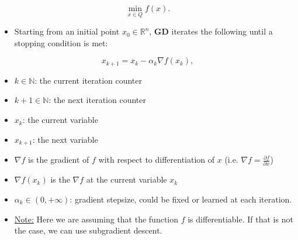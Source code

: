 \documentclass{article}
\begin{document}
\[
\min_{x \in Q} f(x).
\]

\begin{itemize}
    \item Starting from an initial point $x_0 \in \mathbb{R}^n$, \textbf{GD} iterates the following until a stopping condition is met:
\end{itemize}

\[
x_{k+1} = x_k - \alpha_k \nabla f(x_k),
\]

\begin{itemize}
    \item $k \in \mathbb{N}$: the current iteration counter
    \item $k + 1 \in \mathbb{N}$: the next iteration counter
    \item $x_k$: the current variable
    \item $x_{k+1}$: the next variable
    \item $\nabla f$ is the gradient of $f$ with respect to differentiation of $x$ (i.e. $\nabla f = \frac{\partial f}{\partial x}$)
    \item $\nabla f(x_k)$ is the $\nabla f$ at the current variable $x_k$
    \item $\alpha_k \in (0, +\infty)$: gradient stepsize, could be fixed or learned at each iteration. 
    \item \underline{Note:} Here we are assuming that the function $f$ is differentiable. If that is not the case, we can use subgradient descent.
\end{itemize} 
\end{document}
